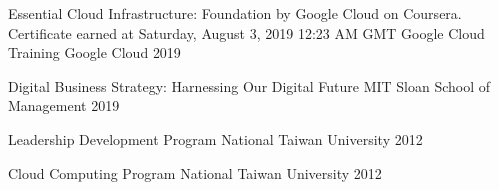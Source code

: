 

\begin{cvhonors}

  \cvhonor
    {Essential Cloud Infrastructure: Foundation by Google Cloud on Coursera. Certificate earned at Saturday, August 3, 2019 12:23 AM GMT} %
    {Google Cloud Training} %
    {Google Cloud} %
    {2019} %

  \cvhonor
    {Digital Business Strategy: Harnessing Our Digital Future} %
    {MIT Sloan School of Management} %
    {} %
    {2019} %

  \cvhonor
    {Leadership Development Program} %
    {National Taiwan University} %
    {} %
    {2012} %

  \cvhonor
    {Cloud Computing Program} %
    {National Taiwan University} %
    {} %
    {2012} %

\end{cvhonors}

